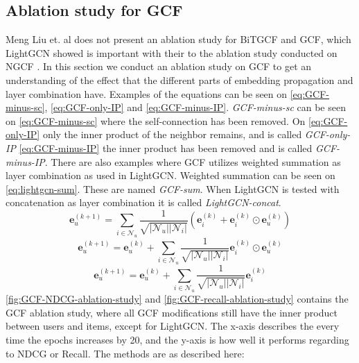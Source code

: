 \subsection{Ablation study for GCF}
Meng Liu et. al does not present an ablation study for BiTGCF and GCF, which LightGCN showed is important with their to the ablation study conducted on NGCF \cite{lightgcn,BiTGCF}.
In this section we conduct an ablation study on GCF to get an understanding of the effect that the different parts of embedding propagation and layer combination have.
Examples of the equations can be seen on \autoref{eq:GCF-minus-sc}, \autoref{eq:GCF-only-IP} and \autoref{eq:GCF-minus-IP}.
\textit{GCF-minus-sc} can be seen on \autoref{eq:GCF-minus-sc} where the self-connection has been removed.
On \autoref{eq:GCF-only-IP} only the inner product of the neighbor remains, and is called \textit{GCF-only-IP}
\autoref{eq:GCF-minus-IP} the inner product has been removed and is called \textit{GCF-minus-IP}.
There are also examples where GCF utilizes weighted summation as layer combination as used in LightGCN.
Weighted summation can be seen on \autoref{eq:lightgcn-sum}.
These are named \textit{GCF-sum}.
When LightGCN is tested with concatenation as layer combination it is called \textit{LightGCN-concat}.
\begin{equation}
    \mathbf{e}_{u}^{(k+1)} = \sum^{}_{i \in \mathcal{N}_u}  \frac{1}{\sqrt{|\mathcal{N}_u||\mathcal{N}_i|}}\left( \mathbf{e}_i^{(k)} + \mathbf{e}_i^{(k)} \odot \mathbf{e}_u^{(k)} \right)
    \label{eq:GCF-minus-sc}
\end{equation}
\begin{equation}
    \mathbf{e}_{u}^{(k+1)} = \mathbf{e}_{u}^{(k)} + \sum^{}_{i \in \mathcal{N}_u}  \frac{1}{\sqrt{|\mathcal{N}_u||\mathcal{N}_i|}} \mathbf{e}_i^{(k)} \odot \mathbf{e}_u^{(k)}
    \label{eq:GCF-only-IP}
\end{equation}
\begin{equation}
    \mathbf{e}_{u}^{(k+1)} = \mathbf{e}_{u}^{(k)} + \sum^{}_{i \in \mathcal{N}_u}  \frac{1}{\sqrt{|\mathcal{N}_u||\mathcal{N}_i|}} \mathbf{e}_i^{(k)}
    \label{eq:GCF-minus-IP}
\end{equation}
\autoref{fig:GCF-NDCG-ablation-study} and \autoref{fig:GCF-recall-ablation-study} contains the GCF ablation study, where all GCF modifications still have the inner product between users and items, except for LightGCN.
The x-axis describes the every time the epochs increases by 20, and the y-axis is how well it performs regarding to NDCG or Recall.
The methods are as described here:\\
